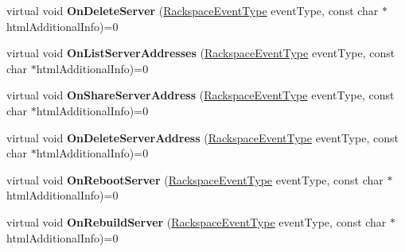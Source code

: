 \begin{DoxyCompactItemize}
\item 
\hypertarget{class_rak_net_1_1_rackspace2_event_callback_a6b174c039e5b0af0dd0e346d8a7d4f94}{virtual void {\bfseries On\-Delete\-Server} (\hyperlink{namespace_rak_net_a120cf6e1a0904cff45269f14c3c4c289}{Rackspace\-Event\-Type} event\-Type, const char $\ast$html\-Additional\-Info)=0}\label{class_rak_net_1_1_rackspace2_event_callback_a6b174c039e5b0af0dd0e346d8a7d4f94}

\item 
\hypertarget{class_rak_net_1_1_rackspace2_event_callback_aa80ea3a062bc0b4e9cd6011f2f051ddb}{virtual void {\bfseries On\-List\-Server\-Addresses} (\hyperlink{namespace_rak_net_a120cf6e1a0904cff45269f14c3c4c289}{Rackspace\-Event\-Type} event\-Type, const char $\ast$html\-Additional\-Info)=0}\label{class_rak_net_1_1_rackspace2_event_callback_aa80ea3a062bc0b4e9cd6011f2f051ddb}

\item 
\hypertarget{class_rak_net_1_1_rackspace2_event_callback_a3c947ddcf9683871b38a29ea16b796e5}{virtual void {\bfseries On\-Share\-Server\-Address} (\hyperlink{namespace_rak_net_a120cf6e1a0904cff45269f14c3c4c289}{Rackspace\-Event\-Type} event\-Type, const char $\ast$html\-Additional\-Info)=0}\label{class_rak_net_1_1_rackspace2_event_callback_a3c947ddcf9683871b38a29ea16b796e5}

\item 
\hypertarget{class_rak_net_1_1_rackspace2_event_callback_a1a09db42291aed119fb32de2c82e4483}{virtual void {\bfseries On\-Delete\-Server\-Address} (\hyperlink{namespace_rak_net_a120cf6e1a0904cff45269f14c3c4c289}{Rackspace\-Event\-Type} event\-Type, const char $\ast$html\-Additional\-Info)=0}\label{class_rak_net_1_1_rackspace2_event_callback_a1a09db42291aed119fb32de2c82e4483}

\item 
\hypertarget{class_rak_net_1_1_rackspace2_event_callback_aea45eb9d8d7ec279ce3a9cd786621d37}{virtual void {\bfseries On\-Reboot\-Server} (\hyperlink{namespace_rak_net_a120cf6e1a0904cff45269f14c3c4c289}{Rackspace\-Event\-Type} event\-Type, const char $\ast$html\-Additional\-Info)=0}\label{class_rak_net_1_1_rackspace2_event_callback_aea45eb9d8d7ec279ce3a9cd786621d37}

\item 
\hypertarget{class_rak_net_1_1_rackspace2_event_callback_a0991d71916dc1bd3e3d35d9a2b25a9d3}{virtual void {\bfseries On\-Rebuild\-Server} (\hyperlink{namespace_rak_net_a120cf6e1a0904cff45269f14c3c4c289}{Rackspace\-Event\-Type} event\-Type, const char $\ast$html\-Additional\-Info)=0}\label{class_rak_net_1_1_rackspace2_event_callback_a0991d71916dc1bd3e3d35d9a2b25a9d3}


\end{DoxyCompactItemize}
